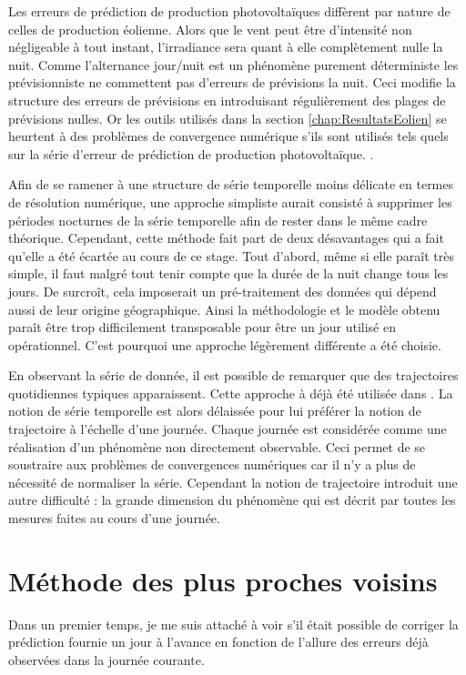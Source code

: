 \documentclass[12pt]{report}
\begin{document}
Les erreurs de prédiction de production photovoltaïques diffèrent par nature de celles de production éolienne. Alors que le vent peut être d'intensité non négligeable à tout instant, l'irradiance sera quant à elle complètement nulle la nuit. Comme l'alternance jour/nuit est un phénomène purement déterministe les prévisionniste ne commettent pas d'erreurs de prévisions la nuit. Ceci modifie la structure des erreurs de prévisions en introduisant régulièrement des plages de prévisions nulles. Or les outils utilisés dans la section \ref{chap:ResultatsEolien} se heurtent à des problèmes de convergence numérique s'ils sont utilisés tels quels sur la série d'erreur de prédiction de production photovoltaïque. .

Afin de se ramener à une structure de série temporelle moins délicate en termes de résolution numérique, une approche simpliste aurait consisté à supprimer les périodes nocturnes de la série temporelle afin de rester dans le même cadre théorique. Cependant, cette méthode fait part de deux désavantages qui a fait qu'elle a été écartée au cours de ce stage. Tout d'abord, même si elle paraît très simple, il faut malgré tout tenir compte que la durée de la nuit change tous les jours. De surcroît, cela imposerait un pré-traitement des données qui dépend aussi de leur origine géographique. Ainsi la méthodologie et le modèle obtenu paraît être trop difficilement transposable pour être un jour utilisé en opérationnel. C'est pourquoi une approche légèrement différente a été choisie.

En observant la série de donnée, il est possible de remarquer que des trajectoires quotidiennes typiques apparaissent. Cette approche à déjà été utilisée dans \cite{latimier_gestion_2016}. La notion de série temporelle est alors délaissée pour lui préférer la notion de trajectoire à l'échelle d'une journée. Chaque journée est considérée comme une réalisation d'un phénomène non directement observable. Ceci permet de se soustraire aux problèmes de convergences numériques car il n'y a plus de nécessité de normaliser la série. Cependant la notion de trajectoire introduit une autre difficulté : la grande dimension du phénomène qui est décrit par toutes les mesures faites au cours d'une journée.

\section{Méthode des plus proches voisins}
Dans un premier temps, je me suis attaché à voir s'il était possible de corriger la prédiction fournie un jour à l'avance en fonction de l'allure des erreurs déjà observées dans la journée courante.
\end{document}
